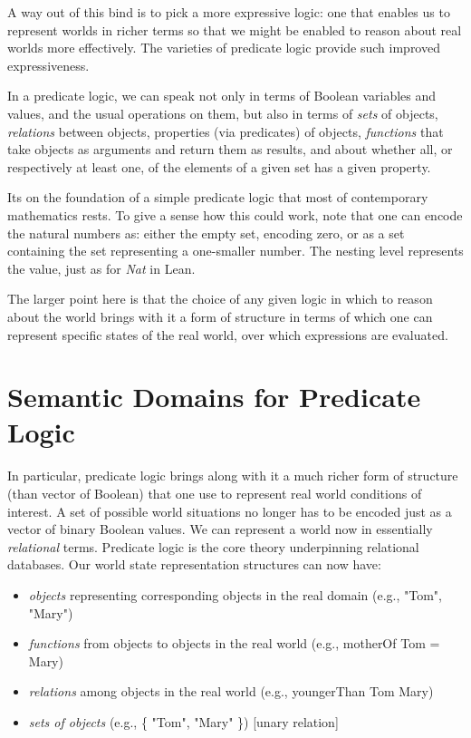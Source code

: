 \documentclass{book}
\providecommand{\tightlist}{%
  \setlength{\itemsep}{0pt}\setlength{\parskip}{0pt}}
\begin{document}
A way out of this bind is to pick a more expressive
logic: one that enables us to represent worlds in richer
terms so that we might be enabled to reason about real
worlds more effectively. The varieties of predicate logic
provide such improved expressiveness.

In a predicate logic, we can speak not only in terms of
Boolean variables and values, and the usual operations on
them, but also in terms of \emph{sets} of objects, \emph{relations}
between objects, properties (via predicates) of objects,
\emph{functions} that take objects as arguments and return them
as results, and about whether all, or respectively at least
one, of the elements of a given set has a given property.

It\textquotesingle s on the foundation of a simple predicate logic that
most of contemporary mathematics rests. To give a sense
how this could work, note that one can encode the natural
numbers as: either the empty set, encoding zero, or as a
set containing the set representing a one-smaller number.
The nesting level represents the value, just as for \emph{Nat} in Lean.

The larger point here is that the choice of any given
logic in which to reason about the world brings with it
a form of structure in terms of which one can represent
specific states of the real world, over which expressions are evaluated.

\hypertarget{book__pandoc__debug__src__predlogic.md__semantic-domains-for-predicate-logic}{%
\section*{Semantic Domains for Predicate Logic}\label{book__pandoc__debug__src__predlogic.md__semantic-domains-for-predicate-logic}}

In particular, predicate logic brings along with it a much
richer form of structure (than vector of Boolean) that one
use to represent real world conditions of interest. A set
of possible world situations no longer has to be encoded
just as a vector of binary Boolean values. We can represent
a world now in essentially \emph{relational} terms. Predicate
logic is the core theory underpinning relational databases.
Our world state representation structures can now have:

\begin{itemize}
\tightlist
\item
  \emph{objects} representing corresponding objects in the real domain (e.g., "Tom", "Mary")
\item
  \emph{functions} from objects to objects  in the real world (e.g., motherOf Tom = Mary)
\item
  \emph{relations} among objects in the real world (e.g., youngerThan Tom Mary)
\item
  \emph{sets of objects} (e.g., \{ "Tom", "Mary" \}) {[}unary relation{]}
\end{itemize}
\end{document}
